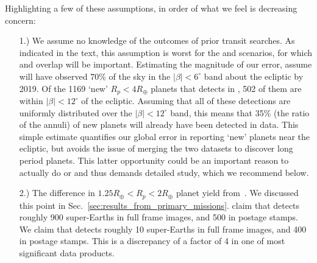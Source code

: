 Highlighting a few of these assumptions, in order of what we feel is decreasing
concern:
\begin{itemize}
\item [1.) We assume no knowledge of the outcomes of prior transit searches.]
  	As indicated in the text, this assumption is worst for the
        \elong\:and \eshort\:scenarios, for which \ktwo and \tesss
        overlap will be important.  Estimating the magnitude of our
        error, assume \ktwo will have observed $70\%$ of the sky in
        the $|\beta|<6^\circ$ band about the ecliptic by 2019.  Of the
        1169 `new' $R_p<4R_\oplus$ planets that \tess detects in
        \elong, 502 of them are within $|\beta|<12^\circ$ of the
        ecliptic.  Assuming that all of these detections are uniformly
        distributed over the $|\beta|<12^\circ$ band, this means that
        35\% (the ratio of the annuli) of \tesss new planets will
        already have been detected in \ktwo data.  This simple
        estimate quantifies our global error in reporting `new'
        planets near the ecliptic, but avoids the issue of merging the
        two datasets to discover long period planets.  This latter
        opportunity could be an important reason to actually do
        \elong\:or \eshort\:and thus demands detailed study, which we
        recommend below.
	
	\item [2.) The difference in $1.25R_\oplus<R_p<2R_\oplus$
          planet yield from~\protect\citetalias{Sullivan_2015}.]  We
          discussed this point in
          Sec.~\ref{sec:results_from_primary_missions}.
           claim that \tess detects roughly
          900 super-Earths in full frame images, and 500 in postage
          stamps.  We claim that \tess detects roughly 10 super-Earths
          in full frame images, and 400 in postage stamps.  This is a
          discrepancy of a factor of 4 in one of \tesss most
          significant data products.
        

\end{itemize}

